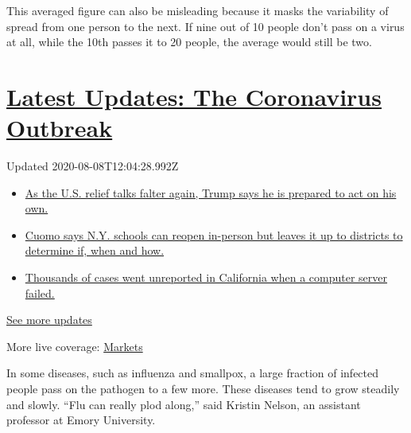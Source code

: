 This averaged figure can also be misleading because it masks the
variability of spread from one person to the next. If nine out of 10
people don't pass on a virus at all, while the 10th passes it to 20
people, the average would still be two.

\hypertarget{latest-updates-the-coronavirus-outbreak}{%
\section{\texorpdfstring{\href{https://www.nytimes.com/2020/08/07/world/covid-19-news.html?action=click\&pgtype=Article\&state=default\&region=MAIN_CONTENT_1\&context=storylines_live_updates}{Latest
Updates: The Coronavirus
Outbreak}}{Latest Updates: The Coronavirus Outbreak}}\label{latest-updates-the-coronavirus-outbreak}}

Updated 2020-08-08T12:04:28.992Z

\begin{itemize}
\tightlist
\item
  \href{https://www.nytimes.com/2020/08/07/world/covid-19-news.html?action=click\&pgtype=Article\&state=default\&region=MAIN_CONTENT_1\&context=storylines_live_updates\#link-1f86d03a}{As
  the U.S. relief talks falter again, Trump says he is prepared to act
  on his own.}
\item
  \href{https://www.nytimes.com/2020/08/07/world/covid-19-news.html?action=click\&pgtype=Article\&state=default\&region=MAIN_CONTENT_1\&context=storylines_live_updates\#link-3f64a70a}{Cuomo
  says N.Y. schools can reopen in-person but leaves it up to districts
  to determine if, when and how.}
\item
  \href{https://www.nytimes.com/2020/08/07/world/covid-19-news.html?action=click\&pgtype=Article\&state=default\&region=MAIN_CONTENT_1\&context=storylines_live_updates\#link-14e70066}{Thousands
  of cases went unreported in California when a computer server failed.}
\end{itemize}

\href{https://www.nytimes.com/2020/08/07/world/covid-19-news.html?action=click\&pgtype=Article\&state=default\&region=MAIN_CONTENT_1\&context=storylines_live_updates}{See
more updates}

More live coverage:
\href{https://www.nytimes.com/live/2020/08/07/business/stock-market-today-coronavirus?action=click\&pgtype=Article\&state=default\&region=MAIN_CONTENT_1\&context=storylines_live_updates}{Markets}

In some diseases, such as influenza and smallpox, a large fraction of
infected people pass on the pathogen to a few more. These diseases tend
to grow steadily and slowly. ``Flu can really plod along,'' said Kristin
Nelson, an assistant professor at Emory University.

